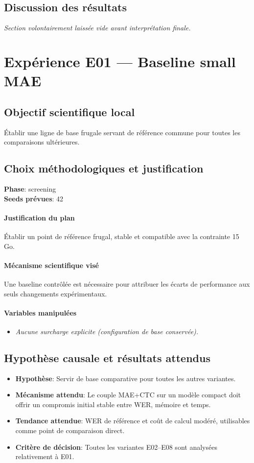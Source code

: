 \documentclass[11pt,a4paper]{article}
\begin{document}
\subsection{Discussion des résultats}
\textit{Section volontairement laissée vide avant interprétation finale.}


\section{Expérience E01 --- Baseline small MAE}
\subsection{Objectif scientifique local}
Établir une ligne de base frugale servant de référence commune pour toutes les comparaisons ultérieures.

\subsection{Choix méthodologiques et justification}
\textbf{Phase}: screening\\
\textbf{Seeds prévues}: 42\\


\paragraph{Justification du plan}
Établir un point de référence frugal, stable et compatible avec la contrainte 15 Go.

\paragraph{Mécanisme scientifique visé}
Une baseline contrôlée est nécessaire pour attribuer les écarts de performance aux seuls changements expérimentaux.

\paragraph{Variables manipulées}
\begin{itemize}
\item \textit{Aucune surcharge explicite (configuration de base conservée).}
\end{itemize}

\subsection{Hypothèse causale et résultats attendus}
\begin{itemize}[leftmargin=1.2cm]
\item \textbf{Hypothèse}: Servir de base comparative pour toutes les autres variantes.
\item \textbf{Mécanisme attendu}: Le couple MAE+CTC sur un modèle compact doit offrir un compromis initial stable entre WER, mémoire et temps.
\item \textbf{Tendance attendue}: WER de référence et coût de calcul modéré, utilisables comme point de comparaison direct.
\item \textbf{Critère de décision}: Toutes les variantes E02--E08 sont analysées relativement à E01.
\end{itemize}
\end{document}
